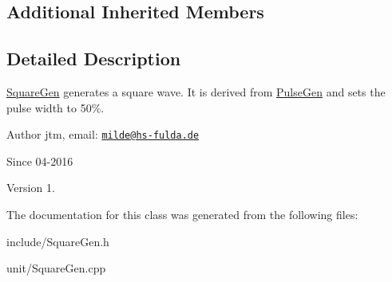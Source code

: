 \subsection*{Additional Inherited Members}


\subsection{Detailed Description}
\hyperlink{classunit_1_1SquareGen}{Square\-Gen} generates a square wave. It is derived from \hyperlink{classunit_1_1PulseGen}{Pulse\-Gen} and sets the pulse width to 50\%.

\begin{DoxyAuthor}{Author}
jtm, email\-:  \href{mailto:milde@hs-fulda.de}{\tt milde@hs-\/fulda.\-de} 
\end{DoxyAuthor}
\begin{DoxySince}{Since}
04-\/2016 
\end{DoxySince}
\begin{DoxyVersion}{Version}
1. 
\end{DoxyVersion}


The documentation for this class was generated from the following files\-:\begin{DoxyCompactItemize}
\item 
include/Square\-Gen.\-h\item 
unit/Square\-Gen.\-cpp\end{DoxyCompactItemize}
